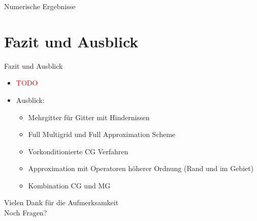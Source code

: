 \documentclass[aspectratio=169]{beamer}
\theoremstyle{thm}
\begin{document}
\begin{frame}{Numerische Ergebnisse}
  \centering
\end{frame}

\section{Fazit und Ausblick}\label{sec:Fazit}
\begin{frame}{Fazit und Ausblick}
  \begin{itemize}[<+(1)->]
    \item \textcolor{red}{\huge TODO}
    \item Ausblick:
      \begin{itemize}
        \item Mehrgitter für Gitter mit Hindernissen
        \item Full Multigrid und Full Approximation Scheme
        \item Vorkonditionierte CG Verfahren
        \item Approximation mit Operatoren höherer Ordnung (Rand und im Gebiet)
        \item Kombination CG und MG
      \end{itemize}
  \end{itemize}
\end{frame}

\begin{frame}[plain]
  \begin{center}
    \Large \textcolor{simtechred}{ Vielen Dank für die Aufmerksamkeit } \\[2em]
    \normalsize Noch Fragen?
  \end{center}
\end{frame}
\end{document}

